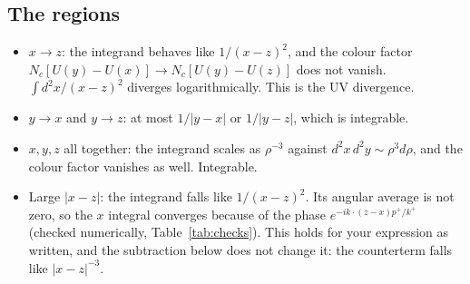 \documentclass[10pt]{article}
\numberwithin{equation}{section}
\begin{document}
\subsection{The regions}
\begin{itemize}
\item $x\to z$: the integrand behaves like $1/(x-z)^2$, and the colour factor $N_c[U(y)-U(x)]\to N_c[U(y)-U(z)]$ does not vanish. $\int d^2x/(x-z)^2$ diverges logarithmically. This is the UV divergence.
\item $y\to x$ and $y\to z$: at most $1/|y-x|$ or $1/|y-z|$, which is integrable.
\item $x,y,z$ all together: the integrand scales as $\rho^{-3}$ against $d^2x\,d^2y\sim\rho^3d\rho$, and the colour factor vanishes as well. Integrable.
\item Large $|x-z|$: the integrand falls like $1/(x-z)^2$. Its angular average is not zero, so the $x$ integral converges because of the phase $e^{-ik\cdot(z-x)p^+/k^+}$ (checked numerically, Table~\ref{tab:checks}). This holds for your expression as written, and the subtraction below does not change it: the counterterm falls like $|x-z|^{-3}$.
\end{itemize}
\end{document}
